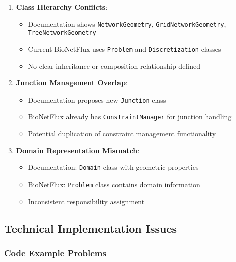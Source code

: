 \begin{enumerate}
    \item \textbf{Class Hierarchy Conflicts}:
    \begin{itemize}
        \item Documentation shows \texttt{NetworkGeometry}, \texttt{GridNetworkGeometry}, \texttt{TreeNetworkGeometry}
        \item Current BioNetFlux uses \texttt{Problem} and \texttt{Discretization} classes
        \item No clear inheritance or composition relationship defined
    \end{itemize}
    
    \item \textbf{Junction Management Overlap}:
    \begin{itemize}
        \item Documentation proposes new \texttt{Junction} class
        \item BioNetFlux already has \texttt{ConstraintManager} for junction handling
        \item Potential duplication of constraint management functionality
    \end{itemize}
    
    \item \textbf{Domain Representation Mismatch}:
    \begin{itemize}
        \item Documentation: \texttt{Domain} class with geometric properties
        \item BioNetFlux: \texttt{Problem} class contains domain information
        \item Inconsistent responsibility assignment
    \end{itemize}
\end{enumerate}

\subsection{Technical Implementation Issues}

\subsubsection{Code Example Problems}

